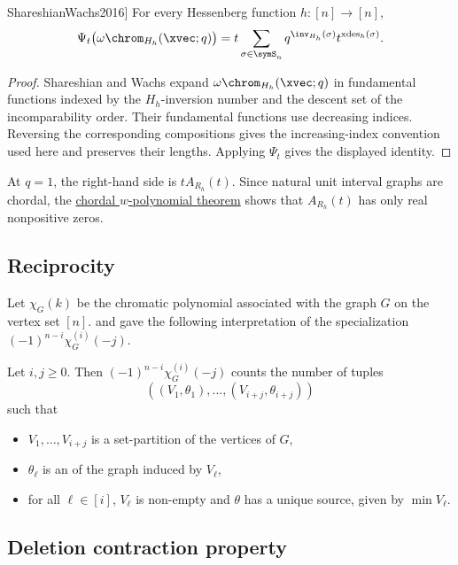 \begin{theorem}[Shareshian--Wachs, \cite[Thm.~3.1]{ShareshianWachs2016}]
For every Hessenberg function $h:[n]\to[n]$,
\[
 \Psi_t\bigl(\omega\chrom_{H_h}(\xvec;q)\bigr)
 =t\sum_{\sigma\in\symS_n}
 q^{\inv_{H_h}(\sigma)}t^{\operatorname{xdes}_h(\sigma)}.
\]
\end{theorem}

\begin{proof}
Shareshian and Wachs expand $\omega\chrom_{H_h}(\xvec;q)$ in fundamental
functions indexed by the $H_h$-inversion number and the descent set of the
incomparability order.  Their fundamental functions use decreasing indices.
Reversing the corresponding compositions gives the increasing-index
convention used here and preserves their lengths.  Applying $\Psi_t$ gives
the displayed identity.
\end{proof}

At $q=1$, the right-hand side is $tA_{R_h}(t)$.  Since natural unit interval
graphs are chordal, the
\hyperref[realRootedChromaticW]{chordal $w$-polynomial theorem} shows that
$A_{R_h}(t)$ has only real nonpositive zeros.


\subsection[chromaticQuasisymmetricReciprocity]{Reciprocity}

Let $\chi_G(k)$ be the chromatic polynomial associated with the graph $G$ on the vertex set $[n]$.
 and  \cite{BernardiNadeau2020} gave the following interpretation of
the specialization $(-1)^{n-i}\chi^{(i)}_G(-j)$.
\begin{theorem}
Let $i,j \geq 0$. Then $(-1)^{n-i}\chi^{(i)}_G(-j)$ counts the number of tuples
\[
\left( (V_1, \theta_1),\dotsc,(V_{i+j}, \theta_{i+j}) \right)
\]
such that
\begin{itemize}
\item $V_1,\dotsc,V_{i+j}$ is a set-partition of the vertices of $G$,
\item $\theta_\ell$ is an \label{acyclicOrientation}
of the graph induced by $V_\ell$,
\item for all $\ell \in [i]$, $V_\ell$ is non-empty and $\theta$ has a unique source, given by $\min V_\ell$.
\end{itemize}
\end{theorem}


\subsection[chromaticDeletionContraction]{Deletion contraction property}

